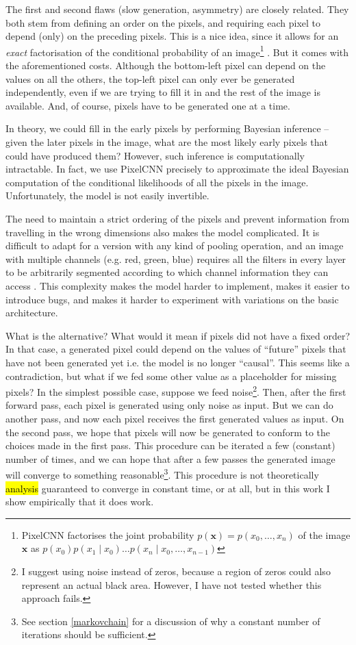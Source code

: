 \documentclass[10pt,a4paper]{article}
\newcommand{\vect}[1]{\mathbf{#1}}
\newcommand{\nquote}[1]{``{#1}''}
\begin{document}
The first and second flaws (slow generation, asymmetry) are closely related. They both stem from defining an order on the pixels, and requiring each pixel to depend (only) on the preceding pixels. This is a nice idea, since it allows for an \emph{exact} factorisation of the conditional probability of an image\footnote{PixelCNN factorises the joint probability $p(\vect{x})=p(x_0,\dots,x_n)$ of the image $\vect{x}$ as $p(x_0)p(x_1\mid x_0)\dots p(x_n\mid x_0,\dots,x_{n-1})$} \citep{pixelcnn1}. But it comes with the aforementioned costs. Although the bottom-left pixel can depend on the values on all the others, the top-left pixel can only ever be generated independently, even if we are trying to fill it in and the rest of the image is available. And, of course, pixels have to be generated one at a time.

In theory, we could fill in the early pixels by performing Bayesian inference -- given the later pixels in the image, what are the most likely early pixels that could have produced them? However, such inference is computationally intractable. In fact, we use PixelCNN precisely to approximate the ideal Bayesian computation of the conditional likelihoods of all the pixels in the image. Unfortunately, the model is not easily invertible.

The need to maintain a strict ordering of the pixels and prevent information from travelling in the wrong dimensions also makes the model complicated. It is difficult to adapt for a version with any kind of pooling operation, and an image with multiple channels (e.g. red, green, blue) requires all the filters in every layer to be arbitrarily segmented according to which channel information they can access \citep{pixelcnn2}. This complexity makes the model harder to implement, makes it easier to introduce bugs, and makes it harder to experiment with variations on the basic architecture.

What is the alternative? What would it mean if pixels did not have a fixed order? In that case, a generated pixel could depend on the values of \nquote{future} pixels that have not been generated yet i.e. the model is no longer \nquote{causal}. This seems like a contradiction, but what if we fed some other value as a placeholder for missing pixels? In the simplest possible case, suppose we feed noise\footnote{I suggest using noise instead of zeros, because a region of zeros could also represent an actual black area. However, I have not tested whether this approach fails.}. Then, after the first forward pass, each pixel is generated using only noise as input. But we can do another pass, and now each pixel receives the first generated values as input. On the second pass, we hope that pixels will now be generated to conform to the choices made in the first pass. This procedure can be iterated a few (constant) number of times, and we can hope that after a few passes the generated image will converge to something reasonable\footnote{See section \ref{markovchain} for a discussion of why a constant number of iterations should be sufficient.}. This procedure is not theoretically \hl{analysis} guaranteed to converge in constant time, or at all, but in this work I show empirically that it does work.
\end{document}

